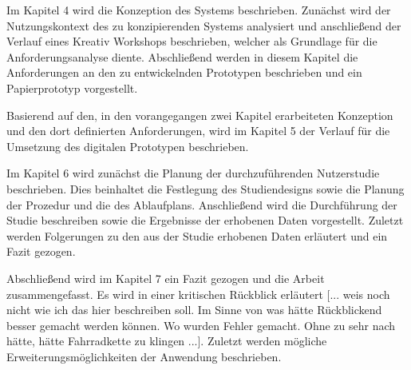 Im Kapitel 4 wird die Konzeption des Systems beschrieben. Zunächst wird der Nutzungskontext des zu konzipierenden Systems analysiert und 
anschließend der Verlauf eines Kreativ Workshops beschrieben, welcher als Grundlage für die Anforderungsanalyse diente. Abschließend werden in diesem Kapitel 
die Anforderungen an den zu entwickelnden Prototypen beschrieben und ein Papierprototyp vorgestellt. 

Basierend auf den, in den vorangegangen zwei Kapitel erarbeiteten Konzeption und den dort definierten Anforderungen, wird im Kapitel 5 der Verlauf für die 
Umsetzung des digitalen Prototypen beschrieben.      

Im Kapitel 6 wird zunächst die Planung der durchzuführenden Nutzerstudie beschrieben. Dies beinhaltet die Festlegung des Studiendesigns sowie die Planung der Prozedur und die des Ablaufplans. 
Anschließend wird die Durchführung der Studie beschreiben sowie die Ergebnisse der erhobenen Daten vorgestellt. Zuletzt werden Folgerungen zu den aus der Studie erhobenen Daten erläutert und ein Fazit gezogen.

Abschließend wird im Kapitel 7 ein Fazit gezogen und die Arbeit zusammengefasst. Es wird in einer kritischen Rückblick erläutert [... weis noch nicht wie ich das hier beschreiben soll. Im Sinne
von was hätte Rückblickend besser gemacht werden können. Wo wurden Fehler gemacht. Ohne zu sehr nach hätte, hätte Fahrradkette zu klingen ...]. 
Zuletzt werden mögliche Erweiterungsmöglichkeiten der Anwendung beschrieben. 